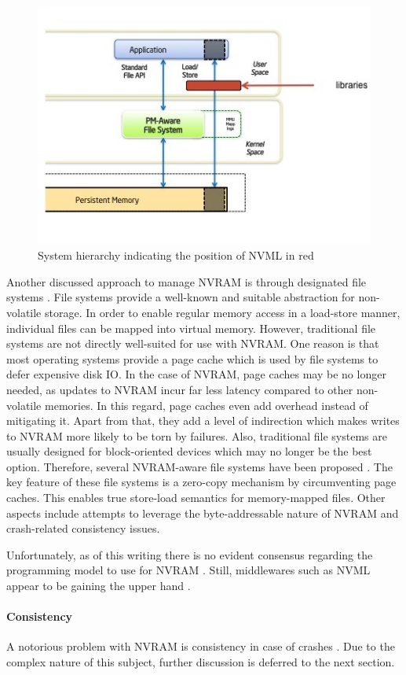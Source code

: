 \begin{figure}[!ht]
    \centering
    \includegraphics[scale=0.75]{figures/nvml-arch.jpg}
    \caption{System hierarchy indicating the position of NVML in red \cite{intel2014nvml}}
    \label{fig:nvml}
\end{figure}

Another discussed approach to manage NVRAM is through designated file systems
\cite{oukid2017data, andrei2017sap}. File systems provide a well-known and
suitable abstraction for non-volatile storage. In order to enable regular memory
access in a load-store manner, individual files can be mapped into virtual
memory. However, traditional file systems are not directly well-suited for use
with NVRAM. One reason is that most operating systems provide a page cache which
is used by file systems to defer expensive disk IO. In the case of NVRAM, page
caches may be no longer needed, as updates to NVRAM incur far less latency
compared to other non-volatile memories. In this regard, page caches even add
overhead instead of mitigating it. Apart from that, they add a level of
indirection which makes writes to NVRAM more likely to be torn by failures.
Also, traditional file systems are usually designed for block-oriented devices
which may no longer be the best option. Therefore, several NVRAM-aware file
systems have been proposed \cite{condit2009better, wu2011scmfs,
dulloor2014system, xu2016nova}. The key feature of these file systems is a
zero-copy mechanism by circumventing page caches. This enables true store-load
semantics for memory-mapped files. Other aspects include attempts to leverage
the byte-addressable nature of NVRAM and crash-related consistency issues.

Unfortunately, as of this writing there is no evident consensus regarding the
programming model to use for NVRAM \cite{boehm2016persistence}. Still,
middlewares such as NVML appear to be gaining the upper hand
\cite{oukid2017data, volos2017whisper, malinowski2017using, andrei2017sap}.

\paragraph{Consistency}

A notorious problem with NVRAM is consistency in case of crashes
\cite{condit2009better, dulloor2014system, oukid2017data}. Due to the complex
nature of this subject, further discussion is deferred to the next section.
